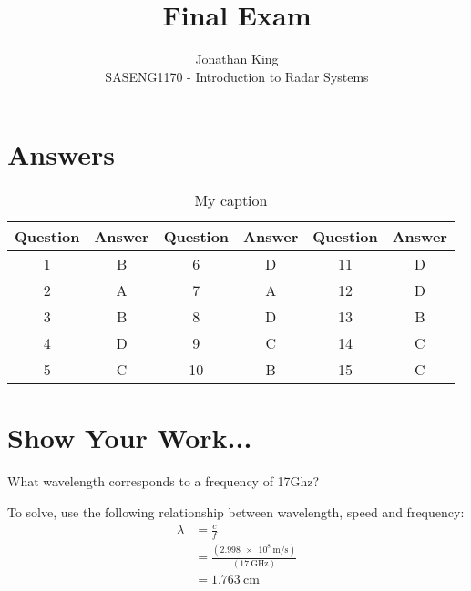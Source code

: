 \documentclass[12pt]{article}
\newenvironment{exercise}[2][Exercise]{\begin{trivlist}
    \item[\hskip \labelsep {\bfseries #1}\hskip \labelsep {\bfseries #2.}]}{\end{trivlist}}
\begin{document}
      
       
      
        
	\title{Final Exam} 
	\author{Jonathan King\\ %
	SASENG1170 - Introduction to Radar Systems} %
	 
	 \maketitle

   \section{Answers}
   \begin{table}[h]
     \centering
     \caption{My caption}
     \label{my-label}
     \begin{tabular}{|c|c|c|c|c|c|}
      \hline
      \rowcolor[HTML]{9B9B9B} 
      Question & Answer & Question & Answer & Question & Answer \\ \hline
      1        & B      & 6        & D      & 11       & D      \\ \hline
      2        & A      & 7        & A      & 12       & D      \\ \hline
      3        & B      & 8        & D      & 13       & B      \\ \hline
      4        & D      & 9        & C      & 14       & C      \\ \hline
      5        & C      & 10       & B      & 15       & C      \\ \hline
     \end{tabular}
    \end{table}

    \section{Show Your Work...}

      \begin{exercise}{1}
      What wavelength corresponds to a frequency of 17Ghz?
      
      To solve, use the following relationship between wavelength, speed and frequency:
      \begin{align*}
      \lambda & = \frac{c}{f} \\
      & = \frac{ (\SI{2.998e8}{\meter\per\second}) }{ (\SI{17}{\GHz}) }\\
      & = \SI{1.763}{\cm}
      \end{align*}
      
      \end{exercise}
      
\end{document}
